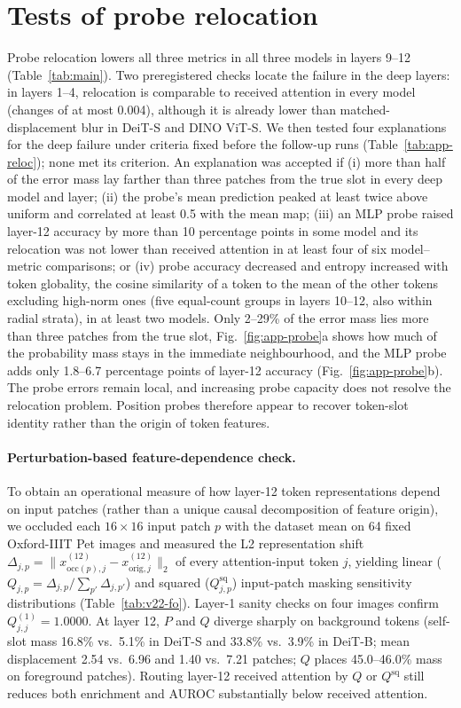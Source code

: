 \section{Tests of probe relocation}
\label{app:reloc}
Probe relocation lowers all three metrics in all three models in layers 9--12 (Table~\ref{tab:main}). Two preregistered checks locate the failure in the deep layers: in layers 1--4, relocation is comparable to received attention in every model (changes of at most 0.004), although it is already lower than matched-displacement blur in DeiT-S and DINO ViT-S. We then tested four explanations for the deep failure under criteria fixed before the follow-up runs (Table~\ref{tab:app-reloc}); none met its criterion. An explanation was accepted if (i) more than half of the error mass lay farther than three patches from the true slot in every deep model and layer; (ii) the probe's mean prediction peaked at least twice above uniform and correlated at least 0.5 with the mean map; (iii) an MLP probe raised layer-12 accuracy by more than 10 percentage points in some model and its relocation was not lower than received attention in at least four of six model--metric comparisons; or (iv) probe accuracy decreased and entropy increased with token globality, the cosine similarity of a token to the mean of the other tokens excluding high-norm ones (five equal-count groups in layers 10--12, also within radial strata), in at least two models. Only 2--29\% of the error mass lies more than three patches from the true slot, Fig.~\ref{fig:app-probe}a shows how much of the probability mass stays in the immediate neighbourhood, and the MLP probe adds only 1.8--6.7 percentage points of layer-12 accuracy (Fig.~\ref{fig:app-probe}b). The probe errors remain local, and increasing probe capacity does not resolve the relocation problem. Position probes therefore appear to recover token-slot identity rather than the origin of token features.

\paragraph{Perturbation-based feature-dependence check.} To obtain an operational measure of how layer-12 token representations depend on input patches (rather than a unique causal decomposition of feature origin), we occluded each $16{\times}16$ input patch $p$ with the dataset mean on 64 fixed Oxford-IIIT Pet images and measured the L2 representation shift $\Delta_{j,p}=\lVert x^{(12)}_{\mathrm{occ}(p),j}-x^{(12)}_{\mathrm{orig},j}\rVert_2$ of every attention-input token $j$, yielding linear ($Q_{j,p}=\Delta_{j,p}/\sum_{p'}\Delta_{j,p'}$) and squared ($Q^{\mathrm{sq}}_{j,p}$) input-patch masking sensitivity distributions (Table~\ref{tab:v22-fo}). Layer-1 sanity checks on four images confirm $Q^{(1)}_{j,j}=1.0000$. At layer 12, $P$ and $Q$ diverge sharply on background tokens (self-slot mass 16.8\% vs.\ 5.1\% in DeiT-S and 33.8\% vs.\ 3.9\% in DeiT-B; mean displacement 2.54 vs.\ 6.96 and 1.40 vs.\ 7.21 patches; $Q$ places 45.0--46.0\% mass on foreground patches). Routing layer-12 received attention by $Q$ or $Q^{\mathrm{sq}}$ still reduces both enrichment and AUROC substantially below received attention.

